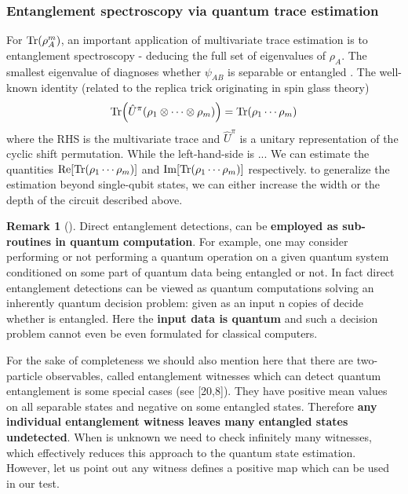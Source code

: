 \documentclass[
aps,
pra,
floatfix,
]{revtex4-2}
\theoremstyle{plain}
\theoremstyle{definition}
\newtheorem{remark}{Remark}
\newcommand{\U}{\hat{U}}
\newcommand{\dm}{\rho}
\begin{document}
\subsubsection{Entanglement spectroscopy via quantum trace estimation}
For $\Tr(\dm_A^m)$, an important application of multivariate trace estimation \cite{quekMultivariateTraceEstimation2022} is to entanglement spectroscopy \cite{ekertDirectEstimationsLinear2002} \cite{johriEntanglementSpectroscopyQuantum2017} \cite{elbenMixedstateEntanglementLocal2020} - deducing the full set of eigenvalues of $\dm_A$. The smallest eigenvalue of diagnoses whether $\psi_{AB}$ is separable or entangled \cite{horodeckiDirectDetectionQuantum2002}. 
The well-known identity (related to the replica trick originating in spin glass theory)
\begin{equation}
	\Tr(\U^{\pi} (\dm_1 \otimes \cdots \otimes \dm_m) ) = 
	\Tr(\dm_1\cdots \dm_m)
\end{equation}
where the RHS is the multivariate trace and $\U^{\pi}$ is a unitary representation of the cyclic shift permutation.
While the left-hand-side is ...
We can estimate the quantities $\Re [\Tr(\dm_1\cdots \dm_m)]$ and $\Im [\Tr(\dm_1\cdots \dm_m)]$ respectively.
to generalize the estimation beyond single-qubit states, we can either increase the width or the depth of the circuit described above.
\begin{remark}[\cite{horodeckiDirectDetectionQuantum2002}]
	Direct entanglement detections, can be \textbf{employed as sub-routines in quantum computation}. For example, one may consider performing or not performing a quantum operation on a given quantum system conditioned on some part of quantum data being entangled or not. In fact direct entanglement detections can be viewed as quantum computations solving an inherently quantum decision problem: given as an input n copies of decide whether is entangled. Here the \textbf{input data is quantum} and such a decision problem cannot even be even formulated for classical computers. 

	For the sake of completeness we should also mention here that there are two-particle observables, called entanglement witnesses which can detect quantum entanglement is some special cases (see [20,8]). They have positive mean values on all separable states and negative on some entangled states. Therefore \textbf{any individual entanglement witness leaves many entangled states undetected}. When is unknown we need to check inﬁnitely many witnesses, which eﬀectively reduces this approach to the quantum state estimation. However, let us point out any witness deﬁnes a positive map which can be used in our test.
\end{remark}
\end{document}
